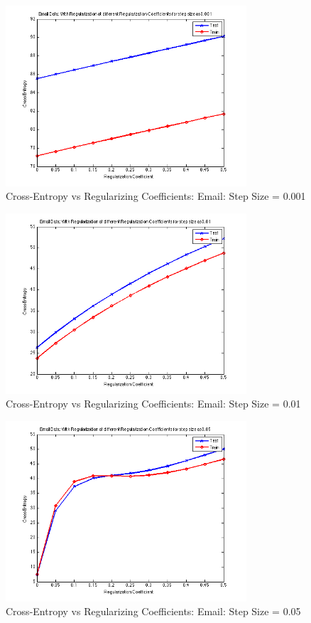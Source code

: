 \documentclass[paper=a4, fontsize=11pt]{scrartcl} %
\numberwithin{equation}{section} %
\numberwithin{figure}{section} %
\numberwithin{table}{section} %
\begin{document}
\begin{figure}[h!]
  \caption{Cross-Entropy vs Regularizing Coefficients: Email: Step Size = 0.001}
  \centering
    \includegraphics[width=0.8\textwidth]{../Pics/subGraphsEmail/Fig1.png}
\end{figure}

\begin{figure}[h!]
  \caption{Cross-Entropy vs Regularizing Coefficients: Email: Step Size = 0.01}
  \centering
    \includegraphics[width=0.8\textwidth]{../Pics/subGraphsEmail/Fig2.png}
\end{figure}

\begin{figure}[h!]
  \caption{Cross-Entropy vs Regularizing Coefficients: Email: Step Size = 0.05}
  \centering
    \includegraphics[width=0.8\textwidth]{../Pics/subGraphsEmail/Fig3.png}
\end{figure}
\end{document}
